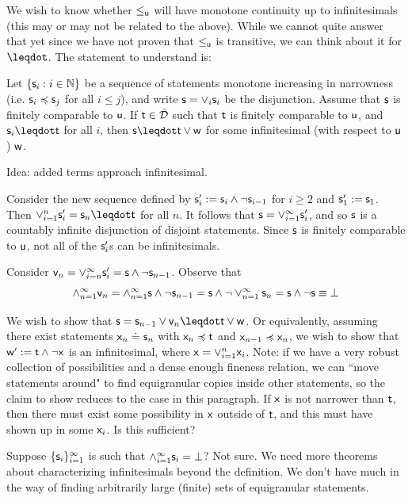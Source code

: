 \documentclass[10pt, onecolumn, longbibliography, nofootinbib]{revtex4-2}
\begin{document}
We wish to know whether $\leq_{\stmt[u]}$ will have monotone continuity up to infinitesimals (this may or may not be related to the above). While we cannot quite answer that yet since we have not proven that $\lequ$ is transitive, we can think about it for $\finer$. The statement to understand is: 

Let $\{\stmt_i:i\in\mathbb{N}\}$ be a sequence of statements monotone increasing in narrowness (i.e. $\stmt_i\narrower\stmt_j$ for all $i\leq j$), and write $\stmt=\OR_i\stmt_i$ be the disjunction. Assume that $\stmt$ is finitely comparable to $\stmt[u]$. If $\stmt[t]\in\tdomain$ such that $\stmt[t]$ is finitely comparable to $\stmt[u]$, and $\stmt_i\finer\stmt[t]$ for all $i$, then $\stmt\finer\stmt[t]\OR\stmt[w]$ for some infinitesimal (with respect to $\stmt[u]$) $\stmt[w]$. 

Idea: added terms approach infinitesimal. 

Consider the new sequence defined by $\stmt'_i := \stmt_i \AND \NOT\stmt_{i-1}$ for $i\geq2$ and $\stmt'_1 := \stmt_1$. Then $\OR_{i=1}^n\stmt'_i = \stmt_n\finer\stmt[t]$ for all $n$. It follows that $\stmt = \OR_{i=1}^{\infty}\stmt'_i$, and so $\stmt$ is a countably infinite disjunction of disjoint statements. Since $\stmt$ is finitely comparable to $\stmt[u]$, not all of the $\stmt_i'$s can be infinitesimals. 

Consider $\stmt[v]_n = \OR_{i=n}^{\infty}\stmt'_i = \stmt \AND\NOT\stmt_{n-1}$. Observe that $$\AND_{n=1}^{\infty}\stmt[v]_n = \AND_{n=1}^{\infty}\stmt\AND\NOT\stmt_{n-1} = \stmt\AND\NOT\OR_{n=1}^{\infty}\stmt_n = \stmt\AND\NOT\stmt \equiv \impossibility$$

We wish to show that $\stmt = \stmt_{n-1}\OR\stmt[v]_n\finer \stmt[t]\OR \stmt[w]$. Or equivalently, assuming there exist statements $\stmt[x]_n\eqgran\stmt_n$ with $\stmt[x]_n\narrower\stmt[t]$ and $\stmt[x]_{n-1}\narrower\stmt[x]_n$, we wish to show that $\stmt[w]' := \stmt[t]\AND\NOT\stmt[x]$ is an infinitesimal, where $\stmt[x]=\OR_{i=1}^n\stmt[x]_i$. Note: if we have a very robust collection of possibilities and a dense enough fineness relation, we can ``move statements around" to find equigranular copies inside other statements, so the claim to show reduces to the case in this paragraph. If $\stmt[x]$ is not narrower than $\stmt[t]$, then there must exist some possibility in $\stmt[x]$ outside of $\stmt[t]$, and this must have shown up in some $\stmt[x]_i$. Is this sufficient? 

Suppose $\{\stmt_i\}_{i=1}^{\infty}$ is such that $\AND_{i=1}^{\infty}\stmt_i = \impossibility$? Not sure. We need more theorems about characterizing infinitesimals beyond the definition. We don't have much in the way of finding arbitrarily large (finite) sets of equigranular statements. 
\end{document}
